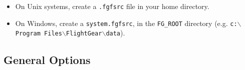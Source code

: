 \begin{itemize}
\item On Unix systems, create a \texttt{.fgfsrc} file in your home directory.
\item On Windows, create a \texttt{system.fgfsrc}, in
the \texttt{FG\_ROOT} directory (e.g. \texttt{c:$\backslash$Program Files$\backslash$FlightGear$\backslash$data}).
\end{itemize}

\subsection{General Options}\label{generaloptions}
